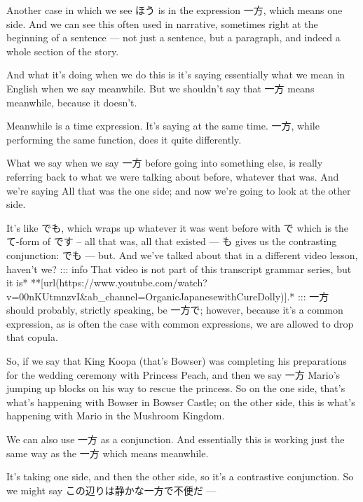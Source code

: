 \stopsectionlevel

\startsectionlevel[title={一方 (いっぽう)},reference={一方-いっぽう}]

Another case in which we see ほう is in the expression 一方, which means one side. And we can see this often used in narrative, sometimes right at the beginning of a sentence --- not just a sentence, but a paragraph, and indeed a whole section of the story.

And what it's doing when we do this is it's saying essentially what we mean in English when we say meanwhile. But we shouldn't say that 一方 means meanwhile, because it doesn't.

Meanwhile is a time expression. It's saying at the same time. 一方, while performing the same function, does it quite differently.

What we say when we say 一方 before going into something else, is really referring back to what we were talking about before, whatever that was. And we're saying All that was the one side; and now we're going to look at the other side.

It's like でも, which wraps up whatever it was went before with で which is the て-form of です -- all that was, all that existed --- も gives us the contrasting conjunction: でも --- but. And we've talked about that in a different video lesson, haven't we? ::: info That video is not part of this transcript grammar series, but it is* **[url(https://www.youtube.com/watch?v=00nKUtmnzvI&ab_channel=OrganicJapanesewithCureDolly)].* ::: 一方 should probably, strictly speaking, be 一方で; however, because it's a common expression, as is often the case with common expressions, we are allowed to drop that copula.

So, if we say that King Koopa (that's Bowser) was completing his preparations for the wedding ceremony with Princess Peach, and then we say 一方 Mario's jumping up blocks on his way to rescue the princess. So on the one side, that's what's happening with Bowser in Bowser Castle; on the other side, this is what's happening with Mario in the Mushroom Kingdom.

We can also use 一方 as a conjunction. And essentially this is working just the same way as the 一方 which means meanwhile.

It's taking one side, and then the other side, so it's a contrastive conjunction. So we might say この辺りは静かな一方で不便だ --- 

